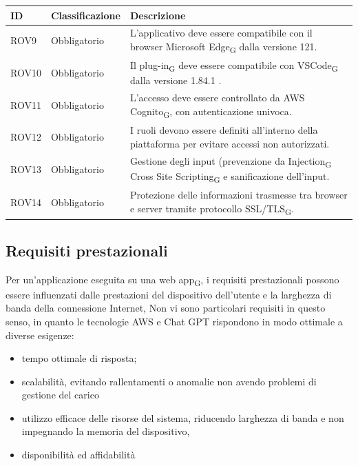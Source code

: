 \documentclass{article}
\begin{document}
\newpage
\begin{center}
\begin{tabular}{|p{3cm}|p{3cm}|p{6cm}|}
\rowcolor{Blue} 
\hline
ID & Classificazione & Descrizione \\
\hline
\rowcolor{LighterBlue} 
ROV9 & Obbligatorio & L'applicativo deve essere compatibile con il browser Microsoft Edge\textsubscript{G} dalla versione 121.\\
\hline
\rowcolor{LightBlue}
ROV10 & Obbligatorio & Il plug-in\textsubscript{G} deve essere compatibile con VSCode\textsubscript{G} dalla versione 1.84.1 .\\
\hline
\rowcolor{LighterBlue}
ROV11 & Obbligatorio & L'accesso deve essere controllato da AWS Cognito\textsubscript{G}, con autenticazione univoca.\\
\hline
\rowcolor{LightBlue}
ROV12 & Obbligatorio & I ruoli devono essere definiti all'interno della piattaforma per evitare accessi non autorizzati.\\
\hline
\rowcolor{LighterBlue}
ROV13 & Obbligatorio & Gestione degli input (prevenzione da Injection\textsubscript{G} Cross Site Scripting\textsubscript{G} e sanificazione dell'input.\\
\hline
\rowcolor{LightBlue}
ROV14 & Obbligatorio & Protezione delle informazioni trasmesse tra browser e server tramite protocollo SSL/TLS\textsubscript{G}.\\
\hline
\end{tabular}
\label{tab:reqvincolo}
\end{center}

\subsection{Requisiti prestazionali}
Per un'applicazione eseguita su una web app\textsubscript{G}, i requisiti prestazionali possono essere influenzati dalle prestazioni del dispositivo dell'utente e la larghezza di banda della connessione Internet, Non vi sono particolari requisiti in questo senso, in quanto le tecnologie AWS e Chat GPT rispondono in modo ottimale a diverse esigenze:
\begin{itemize}
\item tempo ottimale di risposta;
\item scalabilità, evitando rallentamenti o anomalie non avendo problemi di gestione del carico 
\item utilizzo efficace delle risorse del sistema, riducendo larghezza di banda e non impegnando la memoria del dispositivo, 
\item disponibilità ed affidabilità
\end{itemize}
\end{document}
